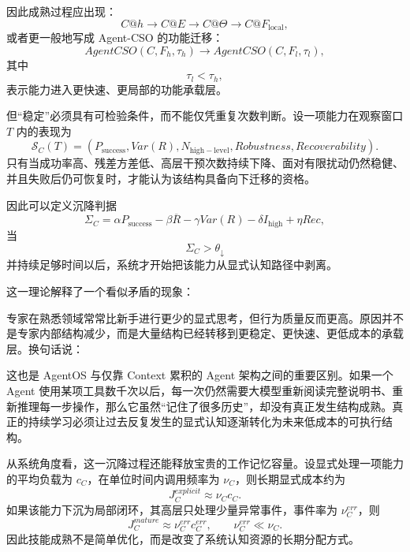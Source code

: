因此成熟过程应出现：
\begin{equation}
C@h
\rightarrow
C@E
\rightarrow
C@\Theta
\rightarrow
C@F_{\mathrm{local}},
\end{equation}
或者更一般地写成 Agent-CSO 的功能迁移：
\begin{equation}
AgentCSO(C,F_h,\tau_h)
\rightarrow
AgentCSO(C,F_l,\tau_l),
\end{equation}
其中
\[
\tau_l<\tau_h,
\]
表示能力进入更快速、更局部的功能承载层。

但``稳定''必须具有可检验条件，而不能仅凭重复次数判断。设一项能力在观察窗口 $T$ 内的表现为
\begin{equation}
\mathcal S_C(T)
=
\left(
P_{\mathrm{success}},
Var(R),
N_{\mathrm{high-level}},
Robustness,
Recoverability
\right).
\end{equation}
只有当成功率高、残差方差低、高层干预次数持续下降、面对有限扰动仍然稳健、并且失败后仍可恢复时，才能认为该结构具备向下迁移的资格。

因此可以定义沉降判据
\begin{equation}
\Sigma_C
=
\alpha P_{\mathrm{success}}
-\beta \overline{R}
-\gamma Var(R)
-\delta I_{\mathrm{high}}
+\eta Rec,
\end{equation}
当
\begin{equation}
\Sigma_C>\theta_{\downarrow}
\end{equation}
并持续足够时间以后，系统才开始把该能力从显式认知路径中剥离。

这一理论解释了一个看似矛盾的现象：
\begin{statementbox}
\centering
{}
\end{statementbox}
专家在熟悉领域常常比新手进行更少的显式思考，但行为质量反而更高。原因并不是专家内部结构减少，而是大量结构已经转移到更稳定、更快速、更低成本的承载层。换句话说：
\begin{statementbox}
\centering
{}
\end{statementbox}

这也是 AgentOS 与仅靠 Context 累积的 Agent 架构之间的重要区别。如果一个 Agent 使用某项工具数千次以后，每一次仍然需要大模型重新阅读完整说明书、重新推理每一步操作，那么它虽然``记住了很多历史''，却没有真正发生结构成熟。真正的持续学习必须让过去反复发生的显式认知逐渐转化为未来低成本的可执行结构。

从系统角度看，这一沉降过程还能释放宝贵的工作记忆容量。设显式处理一项能力的平均负载为 $c_C$，在单位时间内调用频率为 $\nu_C$，则长期显式成本约为
\begin{equation}
J_C^{explicit}
\approx
\nu_C c_C.
\end{equation}
如果该能力下沉为局部闭环，其高层只处理少量异常事件，事件率为 $\nu_C^{err}$，则
\begin{equation}
J_C^{mature}
\approx
\nu_C^{err}c_C^{err},
\qquad
\nu_C^{err}\ll\nu_C.
\end{equation}
因此技能成熟不是简单优化，而是改变了系统认知资源的长期分配方式。

